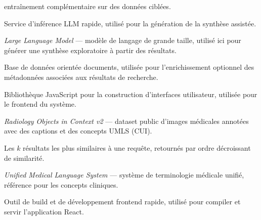 \documentclass[12pt,a4paper]{article}
\newcommand{\NewMajorPart}{\clearpage}
\begin{document}
\begin{description}[leftmargin=7em, style=sameline]
                    entraînement complémentaire sur des données ciblées.
  \item[Groq]       Service d'inférence LLM rapide, utilisé pour la génération de la
                    synthèse assistée.
  \item[LLM]        \textit{Large Language Model} --- modèle de langage de grande taille,
                    utilisé ici pour générer une synthèse exploratoire à partir des résultats.
  \item[MongoDB]    Base de données orientée documents, utilisée pour l'enrichissement
                    optionnel des métadonnées associées aux résultats de recherche.
  \item[React]      Bibliothèque JavaScript pour la construction d'interfaces utilisateur,
                    utilisée pour le frontend du système.
  \item[ROCOv2]     \textit{Radiology Objects in Context v2} --- dataset public d'images
                    médicales annotées avec des captions et des concepts UMLS (CUI).
  \item[Top-k]      Les $k$ résultats les plus similaires à une requête, retournés par
                    ordre décroissant de similarité.
  \item[UMLS]       \textit{Unified Medical Language System} --- système de terminologie
                    médicale unifié, référence pour les concepts cliniques.
  \item[Vite]       Outil de build et de développement frontend rapide, utilisé pour
                    compiler et servir l'application React.
\end{description}

\NewMajorPart
\printindex

\end{document}
